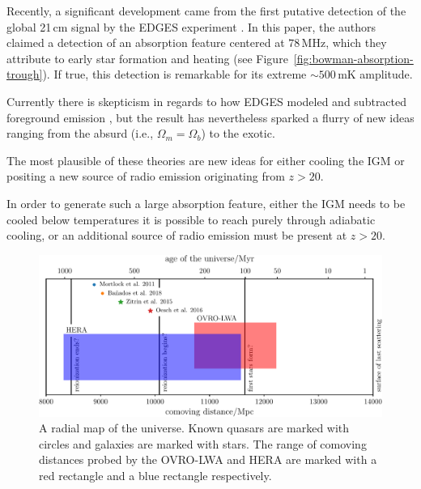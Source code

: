 \begin{bibunit}
Recently, a significant development came from the first putative detection of the global 21\,cm
signal by the EDGES experiment \citep{2018Natur.555...67B}. In this paper, the authors claimed a
detection of an absorption feature centered at $78\,\text{MHz}$, which they attribute to early star
formation and heating (see Figure~\ref{fig:bowman-absorption-trough}). If true, this detection is
remarkable for its extreme $\sim500\,\text{mK}$ amplitude.

Currently there is skepticism in regards to how EDGES modeled and subtracted foreground emission
\citep{2018arXiv180501421H}, but the result has nevertheless sparked a flurry of new ideas ranging
from the absurd (i.e., $\Omega_m = \Omega_b$) to the exotic.

The most plausible of these theories are new ideas for either cooling the IGM or positing a new
source of radio emission originating from $z > 20$.

In order to generate such a large
absorption feature, either the IGM needs to be cooled below temperatures it is possible to reach
purely through adiabatic cooling, or an additional source of radio emission must be present at $z >
20$.







\begin{figure}[t]
    \centering
    \includegraphics[width=\textwidth]{figures/chapter1/history-of-the-universe/history-of-the-universe}
    \caption{
        A radial map of the universe. Known quasars are marked with circles and galaxies are marked
        with stars. The range of comoving distances probed by the OVRO-LWA and HERA are marked with a red
        rectangle and a blue rectangle respectively.
    }
    \label{fig:history-of-the-universe}
\end{figure}











\end{bibunit}

